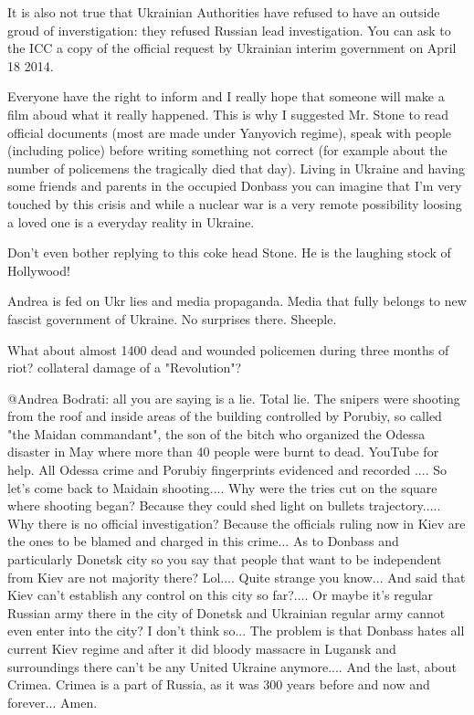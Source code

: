 \begin{itemize}
\begin{itemize} %

It is also not true that Ukrainian Authorities have refused to have an outside
groud of inverstigation: they refused Russian lead investigation. You can ask
to the ICC a copy of the official request by Ukrainian interim government on
April 18 2014.



Everyone have the right to inform and I really hope that someone will make a
film aboud what it really happened. This is why I suggested Mr. Stone to read
official documents (most are made under Yanyovich regime), speak with people
(including police) before writing something not correct (for example about the
number of policemens the tragically died that day). Living in Ukraine and
having some friends and parents in the occupied Donbass you can imagine that
I'm very touched by this crisis and while a nuclear war is a very remote
possibility loosing a loved one is a everyday reality in Ukraine.


Don't even bother replying to this coke head Stone. He is the laughing stock of
Hollywood!


Andrea is fed on Ukr lies and media propaganda. Media that fully belongs to new
fascist government of Ukraine. No surprises there. Sheeple.


What about almost 1400 dead and wounded policemen during three months of riot?
collateral damage of a "Revolution"?


@Andrea Bodrati: all you are saying is a lie. Total lie. The snipers were
shooting from the roof and inside areas of the building controlled by Porubiy,
so called "the Maidan commandant", the son of the bitch who organized the
Odessa disaster in May where more than 40 people were burnt to dead. YouTube
for help. All Odessa crime and Porubiy fingerprints evidenced and recorded ....
So let's come back to Maidain shooting.... Why were the tries cut on the square
where shooting began? Because they could shed light on bullets trajectory.....
Why there is no official investigation? Because the officials ruling now in
Kiev are the ones to be blamed and charged in this crime... As to Donbass and
particularly Donetsk city so you say that people that want to be independent
from Kiev are not majority there? Lol.... Quite strange you know... And said
that Kiev can't establish any control on this city so far?.... Or maybe it's
regular Russian army there in the city of Donetsk and Ukrainian regular army
cannot even enter into the city? I don't think so... The problem is that
Donbass hates all current Kiev regime and after it did bloody massacre in
Lugansk and surroundings there can't be any United Ukraine anymore.... And the
last, about Crimea. Crimea is a part of Russia, as it was 300 years before and
now and forever... Amen.


\end{itemize}
\end{itemize}
